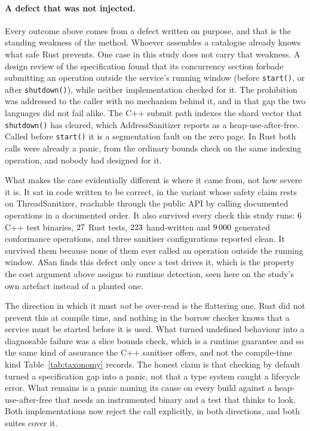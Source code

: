 \documentclass[english,oneside,a4paper,censored,csm,software-track-2020]{HYthesisML}
\begin{document}
\paragraph{A defect that was not injected.}
Every outcome above comes from a defect written on purpose, and that is the standing weakness of
the method. Whoever assembles a catalogue already knows what safe Rust prevents. One case in
this study does not carry that weakness. A design review of the specification found that its
concurrency section forbade submitting an operation outside the service's running window
(before \texttt{start()}, or after \texttt{shutdown()}), while neither implementation checked
for it. The prohibition was addressed to the caller with no mechanism behind it, and in that gap
the two languages did not fail alike. The C++ submit path indexes the shard vector that
\texttt{shutdown()} has cleared, which AddressSanitizer reports as a heap-use-after-free. Called
before \texttt{start()} it is a segmentation fault on the zero page. In Rust both calls were
already a panic, from the ordinary bounds check on the same indexing operation, and nobody had
designed for it.

What makes the case evidentially different is where it came from, not how severe it is. It sat in
code written to be correct, in the variant whose safety claim rests on ThreadSanitizer, reachable
through the public API by calling documented operations in a documented order. It also survived
every check this study runs: $6$ C++ test binaries, $27$ Rust tests,
$223$ hand-written and $9\,000$ generated conformance operations, and three
sanitiser configurations reported clean. It survived them because none of them ever called an
operation outside the running window. ASan finds this defect only once a test drives it, which is
the property the cost argument above assigns to runtime detection, seen here on the study's own
artefact instead of a planted one.

The direction in which it must \emph{not} be over-read is the flattering one. Rust did not
prevent this at compile time, and nothing in the borrow checker knows that a service must be
started before it is used. What turned undefined behaviour into a diagnosable failure was a
slice bounds check, which is a runtime guarantee and so the same kind of assurance the C++
sanitiser offers, and not the compile-time kind Table~\ref{tab:taxonomy} records. The
honest claim is that checking by default turned a specification gap into a panic, not that a
type system caught a lifecycle error. What remains is a panic naming its cause on every build
against a heap-use-after-free that needs an instrumented binary and a test that thinks to look.
Both implementations now reject the call explicitly, in both directions, and both suites cover
it.
\end{document}
